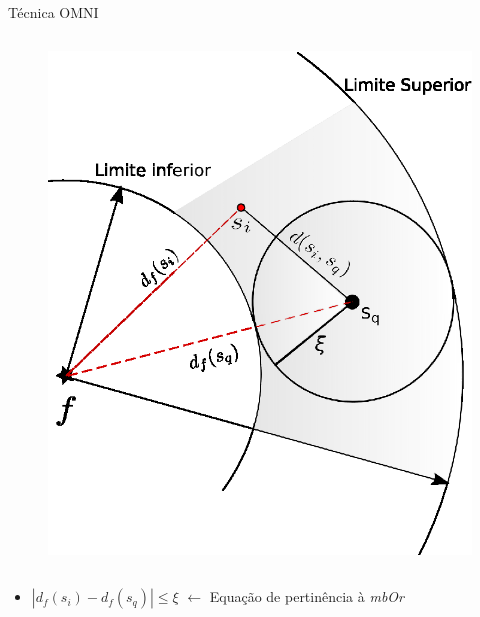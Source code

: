 \documentclass{beamer}
\begin{document}
\begin{frame}{Técnica OMNI}
\begin{columns}
\begin{column}{0.4\linewidth}
\begin{figure}[H!]
	      \includegraphics[width=1\linewidth]{destri_omni.eps}
	    \end{figure}
      \end{column}

  \end{columns}
  \begin{itemize}
   \item $|d_f(s_i) - d_f(s_q)| \leq \xi$ $\leftarrow$ Equação de pertinência à \textit{mbOr}
  \end{itemize}

\end{frame}
\end{document}
